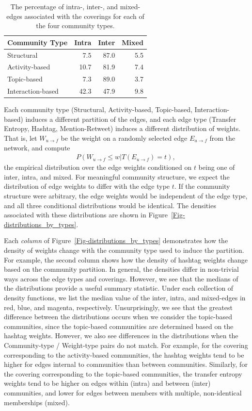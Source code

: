 \begin{table}
	\caption{The percentage of intra-, inter-, and mixed-edges associated with the coverings for each of the four community types.}
	\centering
	\begin{tabular}{l | r r r}
		Community Type & Intra & Inter & Mixed \\
		\hline
		Structural & 7.5 & 87.0 &  5.5 \\
		Activity-based & 10.7 & 81.9 & 7.4 \\
		Topic-based & 7.3 & 89.0  & 3.7 \\
		Interaction-based & 42.3 & 47.9 & 9.8
	\end{tabular}
\end{table}

Each community type (Structural, Activity-based, Topic-based, Interaction-based) induces a different partition of the edges, and each edge type (Transfer Entropy, Hashtag, Mention-Retweet) induces a different distribution of weights. That is, let $W_{u \to f}$ be the weight on a randomly selected edge $E_{u \to f}$ from the network, and compute
\begin{align}
	P(W_{u \to f} \leq w | T(E_{u \to f}) = t),
\end{align}
the empirical distribution over the edge weights conditioned on $t$ being one of inter, intra, and mixed. For meaningful community structure, we expect the distribution of edge weights to differ with the edge type $t$. If the community structure were arbitrary, the edge weights would be independent of the edge type, and all three conditional distributions would be identical.
The densities associated with these distributions are shown in Figure~\ref{Fig-distributions_by_types}. 

Each \emph{column} of Figure~\ref{Fig-distributions_by_types} demonstrates how the density of weights change with the community type used to induce the partition. For example, the second column shows how the density of hashtag weights change based on the community partition. In general, the densities differ in non-trivial ways across the edge types and coverings. However, we see that the medians of the distributions provide a useful summary statistic. Under each collection of density functions, we list the median value of the inter, intra, and mixed-edges in red, blue, and magenta, respectively. Unsurprisingly, we see that the greatest difference between the distributions occurs when we consider the topic-based communities, since the topic-based communities are determined based on the hashtag weights. However, we also see differences in the distributions when the Community-type / Weight-type pairs do not match. For example, for the covering corresponding to the activity-based communities, the hashtag weights tend to be higher for edges internal to communities than between communities. Similarly, for the covering corresponding to the topic-based communities, the transfer entropy weights tend to be higher on edges within (intra) and between (inter) communities, and lower for edges between members with multiple, non-identical memberships (mixed).

